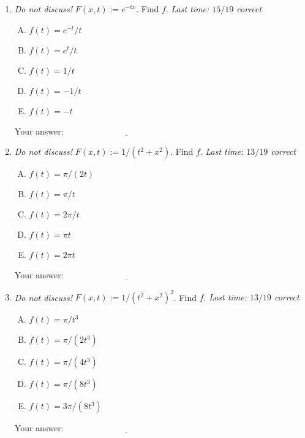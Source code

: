 \documentclass[10pt]{amsart}
\begin{document}
\begin{enumerate}

\item {\em Do not discuss!} $F(x,t) := e^{-tx}$. Find $f$. {\em Last
  time: $15/19$ correct}

  \begin{enumerate}[(A)]
  \item $f(t) = e^{-t}/t$
  \item $f(t) = e^t/t$
  \item $f(t) = 1/t$
  \item $f(t) = -1/t$
  \item $f(t) = -t$
  \end{enumerate}

  \vspace{0.1in}
  Your answer: $\underline{\qquad\qquad\qquad\qquad\qquad\qquad\qquad}$
  \vspace{0.15in}

\item {\em Do not discuss!} $F(x,t) := 1/(t^2 + x^2)$. Find $f$. {\em
  Last time: $13/19$ correct}

  \begin{enumerate}[(A)]
  \item $f(t) = \pi/(2t)$
  \item $f(t) = \pi/t$
  \item $f(t) = 2\pi/t$
  \item $f(t) = \pi t$
  \item $f(t) = 2\pi t$
  \end{enumerate}

  \vspace{0.1in}
  Your answer: $\underline{\qquad\qquad\qquad\qquad\qquad\qquad\qquad}$
  \vspace{0.15in}

\item {\em Do not discuss!} $F(x,t) := 1/(t^2 + x^2)^2$. Find $f$. {\em Last time: $13/19$ correct}

  \begin{enumerate}[(A)]
  \item $f(t) = \pi/t^3$
  \item $f(t) = \pi/(2t^3)$
  \item $f(t) = \pi/(4t^3)$
  \item $f(t) = \pi/(8t^3)$
  \item $f(t) = 3\pi/(8t^3)$
  \end{enumerate}

  \vspace{0.1in}
  Your answer: $\underline{\qquad\qquad\qquad\qquad\qquad\qquad\qquad}$
  \vspace{0.15in}


\end{enumerate}
\end{document}
